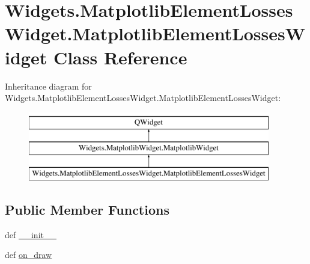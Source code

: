 \hypertarget{classWidgets_1_1MatplotlibElementLossesWidget_1_1MatplotlibElementLossesWidget}{\section{Widgets.\-Matplotlib\-Element\-Losses\-Widget.\-Matplotlib\-Element\-Losses\-Widget Class Reference}
\label{classWidgets_1_1MatplotlibElementLossesWidget_1_1MatplotlibElementLossesWidget}
}
Inheritance diagram for Widgets.\-Matplotlib\-Element\-Losses\-Widget.\-Matplotlib\-Element\-Losses\-Widget\-:\begin{figure}[H]
\begin{center}
\leavevmode
\includegraphics[height=3.000000cm]{classWidgets_1_1MatplotlibElementLossesWidget_1_1MatplotlibElementLossesWidget}
\end{center}
\end{figure}
\subsection*{Public Member Functions}
\begin{DoxyCompactItemize}
\item 
def \hyperlink{classWidgets_1_1MatplotlibElementLossesWidget_1_1MatplotlibElementLossesWidget_a6a11ddff80e87bdffe8755af53f8479d}{\-\_\-\-\_\-init\-\_\-\-\_\-}
\item 
def \hyperlink{classWidgets_1_1MatplotlibElementLossesWidget_1_1MatplotlibElementLossesWidget_a327fc01d1a404206f753fbef144f8518}{on\-\_\-draw}
\end{DoxyCompactItemize}
